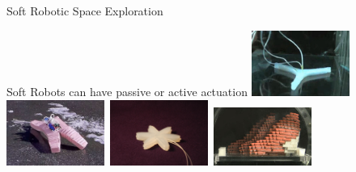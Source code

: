 \documentclass[6pt]{beamer}
\begin{document}
{\begin{frame}{Soft Robotic Space Exploration}
\vspace{0.2cm}
\begin{block}{Soft Robots can have passive or active actuation}
\includegraphics[width=0.24\textwidth,height=0.20\textheight]{../Figures/Misc/ExplodingRobot.jpg}\	
\includegraphics[width=0.24\textwidth,height=0.20\textheight]{../Figures/Misc/softbot.jpg}\
\includegraphics[width=0.24\textwidth,height=0.20\textheight]{../Figures/Misc/soft_robotics_figure.png}\		
\includegraphics[width=0.24\textwidth,height=0.20\textheight]{../Figures/Misc/hillerPressureChamber.png}
\end{block}
\begin{center}
\end{center}
\end{frame}
}
\end{document}
